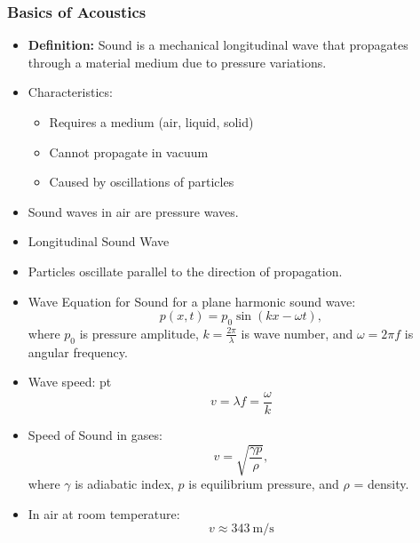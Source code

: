 \documentclass[t,aspectratio=169]{beamer}
\begin{document}
\begin{frame}
\frametitle{Basics of Acoustics}
\begin{itemize}
\item \textbf{Definition:} Sound is a mechanical longitudinal wave that propagates through a material medium due to pressure variations.
\item Characteristics:
\begin{itemize}
    \item Requires a medium (air, liquid, solid)
    \item Cannot propagate in vacuum
    \item Caused by oscillations of particles
\end{itemize}
\item Sound waves in air are pressure waves.
\item Longitudinal Sound Wave

\begin{center}
\end{center}
\item Particles oscillate parallel to the direction of propagation.

\pagebreak
\item Wave Equation for Sound for a plane harmonic sound wave:
$$p\left(x,t\right) = p_0 \sin\left(kx - \omega t\right),$$
where $p_0$ is pressure amplitude, $k = \frac{2\pi}{\lambda}$ is wave number, and $\omega = 2\pi f$ is angular frequency.
\item Wave speed:
 pt
$$v = \lambda f = \frac{\omega}{k}$$
\item Speed of Sound in gases:
$$v = \sqrt{\frac{\gamma p}{\rho}},$$
where $\gamma$ is adiabatic index, $p$ is equilibrium pressure, and $\rho$ = density.
\item In air at room temperature:
$$ v \approx 343 \ \text{m/s} $$


\end{itemize}
\end{frame}
\end{document}
